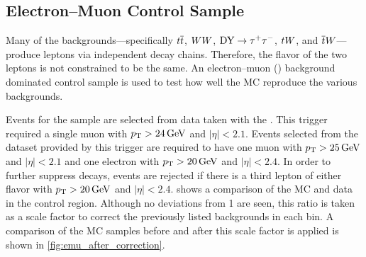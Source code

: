 


\subsection{Electron--Muon Control Sample}
\label{ssec:emu_sample}

Many of the backgrounds---specifically $t \overline{t}$, $W W$, $\text{DY} \to \tau^{+} \tau^{-}$, $t W$,
and $\overline{t} W$---produce leptons via independent decay chains. Therefore, the
flavor of the two leptons is not constrained to be the same. An electron--muon
(\emu) background dominated control sample is used to test how well the MC
reproduce the various backgrounds.

Events for the \emu sample are selected from data taken with the
\SingleMuonTrigger. This trigger required a single muon with $\pt >
\SI{24}{\GeV}$ and $|\eta| < 2.1$. Events selected from the dataset provided by
this trigger are required to have one muon with $\pt > \SI{25}{\GeV}$ and
$|\eta| < 2.1$ and one electron with $\pt > \SI{20}{\GeV}$ and $|\eta| < 2.4$.
In order to further suppress \Z decays, events are rejected if there is a third
lepton of either flavor with $\pt > \SI{20}{\GeV}$ and $|\eta| < 2.4$.
 shows a comparison of the MC and data in the
control region. Although no deviations from \num{1} are seen, this ratio is
taken as a scale factor to correct the previously listed backgrounds in each
bin. A comparison of the \Ztomumu MC samples before and after this scale factor
is applied is shown in \cref{fig:emu_after_correction}.

